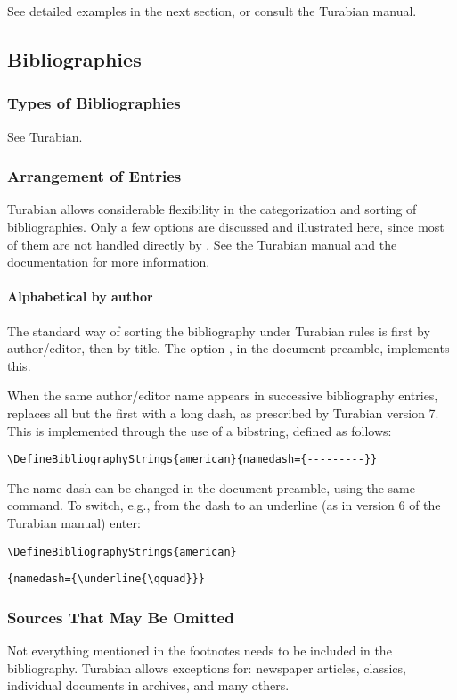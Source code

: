 \documentclass{ltxdockit}[2010/02/12]
\begin{document}
See detailed examples in the next section, or consult the Turabian manual.

\subsection{Bibliographies}

\subsubsection{Types of Bibliographies}
See Turabian.

\subsubsection{Arrangement of Entries}

Turabian allows considerable flexibility in the categorization and sorting of bibliographies. Only a few options are discussed and illustrated here, since most of them are not handled directly by . See the Turabian manual and the  documentation for more information.


\paragraph{Alphabetical by author}
The standard way of sorting the bibliography under Turabian rules is first by author/editor, then by title. The  option , in the document preamble, implements this.

When the same author/editor name appears in successive bibliography entries,  replaces all but the first with a long dash, as prescribed by Turabian version 7. This is implemented through the use of a  bibstring, defined as follows:

\verb|\DefineBibliographyStrings{american}{namedash={---------}}|

The name dash can be changed in the document preamble, using the same command. To switch, e.g., from the dash to an underline (as in version 6 of the Turabian manual) enter:

\verb|\DefineBibliographyStrings{american}|

\qquad\verb|{namedash={\underline{\qquad}}}|


\subsubsection{Sources That May Be Omitted}\label{nobib}
Not everything mentioned in the footnotes needs to be included in the bibliography. Turabian allows exceptions for: newspaper articles, classics, individual documents in archives, and many others. 
\end{document}
